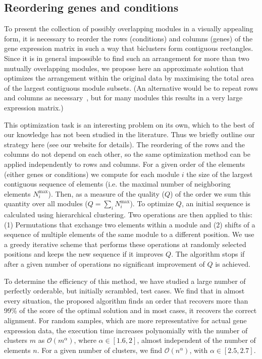 \documentclass[round]{bioinfo}
\begin{document}
\subsection{Reordering genes and conditions}
To present the collection of possibly overlapping modules in a visually
appealing form, it is necessary to reorder the rows (conditions) and
columns (genes) of the gene expression matrix in such a way that biclusters form contiguous
rectangles. Since it is in general impossible to find such an
arrangement for more than two mutually overlapping modules, we propose
here an approximate solution that optimizes the arrangement within the
original data by maximising the total area of the largest contiguous
module subsets. (An alternative would be to repeat rows and columns as
necessary~\citep{grothaus06}, but for many modules this results in
a very large expression matrix.)

This optimization task is an interesting problem on its own, which to
the best of our knowledge has not been studied in the literature. Thus
we briefly outline our strategy here (see our website for details).
The reordering of the rows and the columns do not depend on each
other, so the same optimization method can be applied independently
to rows and columns. For a given order of the
elements (either genes or conditions) we compute for each module $i$ the
size of the largest contiguous sequence of elements (i.e. the maximal
number of neighboring elements $N^\text{max}_i$). Then, as a measure of the
quality ($Q$) of the order we sum this quantity over all modules
($Q=\sum_i N^\text{max}_i$). To optimize $Q$, an initial sequence is calculated using
hierarchical clustering. Two operations are then applied to this: (1)
Permutations that exchange two elements within a module and (2) shifts
of a sequence of multiple elements of the same module to a different position. We
use a greedy iterative scheme that performs these operations at
randomly selected positions and keeps the new sequence if it improves
$Q$. The algorithm stops if after a given number of operations no
significant improvement of $Q$ is achieved.

To determine the efficiency of this method, we have studied a large
number of perfectly orderable, but initially scrambled, test cases. We
find that in almost every situation, the proposed algorithm finds an
order that recovers more than 99\% of the score of the optimal
solution and in most cases, it recovers the correct
alignment. For random samples, which are more representative for
actual gene expression data, the execution time increases polynomially
with the number of clusters $m$ as ${\mathcal O}(m^\alpha)$, where
$\alpha \in [1.6, 2]$, almost independent of the number of elements
$n$. For a given number of clusters, we find ${\mathcal O}(n^\alpha)$,
with $\alpha \in [2.5, 2.7]$.
\end{document}
